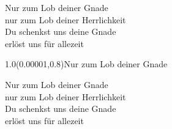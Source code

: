 \documentclass[aspectratio=169]{beamer}
\begin{document}
\begin{frame}
\centering
\color{white}
\huge{Nur zum Lob deiner Gnade} \\
\huge{nur zum Lob deiner Herrlichkeit} \\
\huge{Du schenkst uns deine Gnade} \\
\huge{erlöst uns für allezeit} \\

\begin{textblock}{1.0}(0.00001,0.8)\color{gray}\normalsize{Nur zum Lob deiner Gnade}\end{textblock}
\end{frame}

\begin{frame}
\centering
\color{white}
\huge{Nur zum Lob deiner Gnade} \\
\huge{nur zum Lob deiner Herrlichkeit} \\
\huge{Du schenkst uns deine Gnade} \\
\huge{erlöst uns für allezeit} \\
\end{frame}
\end{document}
